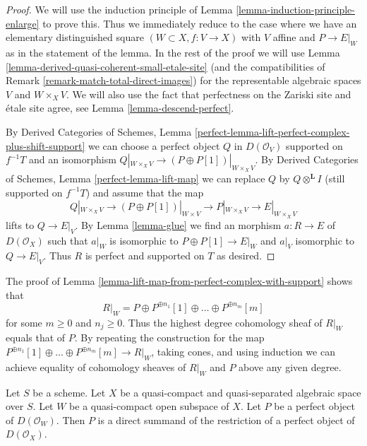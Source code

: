 \begin{proof}
We will use the induction principle of
Lemma \ref{lemma-induction-principle-enlarge} to prove this.
Thus we immediately reduce to the case where we have an
elementary distinguished square $(W \subset X, f : V \to X)$
with $V$ affine and $P \to E|_W$ as in the statement of the lemma.
In the rest of the proof we will use
Lemma \ref{lemma-derived-quasi-coherent-small-etale-site}
(and the compatibilities of Remark \ref{remark-match-total-direct-images})
for the representable algebraic spaces $V$ and $W \times_X V$.
We will also use the fact that perfectness on the Zariski site
and \'etale site agree, see Lemma \ref{lemma-descend-perfect}.

\medskip\noindent
By Derived Categories of Schemes,
Lemma \ref{perfect-lemma-lift-perfect-complex-plus-shift-support}
we can choose a perfect object $Q$ in $D(\mathcal{O}_V)$
supported on $f^{-1}T$ and an isomorphism
$Q|_{W \times_X V} \to (P \oplus P[1])|_{W \times_X V}$. By
Derived Categories of Schemes, Lemma \ref{perfect-lemma-lift-map}
we can replace $Q$ by $Q \otimes^\mathbf{L} I$ (still supported on $f^{-1}T$)
and assume that the map
$$
Q|_{W \times_X V} \to (P \oplus P[1])|_{W \times V}
\longrightarrow P|_{W \times_X V}
\longrightarrow
E|_{W \times_X V}
$$
lifts to $Q \to E|_V$. By Lemma \ref{lemma-glue}
we find an morphism $a : R \to E$ of $D(\mathcal{O}_X)$
such that $a|_W$ is isomorphic to $P \oplus P[1] \to E|_W$
and $a|_V$ isomorphic to $Q \to E|_V$.
Thus $R$ is perfect and supported on $T$ as desired.
\end{proof}

\begin{remark}
\label{remark-addendum}
The proof of Lemma \ref{lemma-lift-map-from-perfect-complex-with-support}
shows that
$$
R|_W = P \oplus P^{\oplus n_1}[1] \oplus \ldots \oplus P^{\oplus n_m}[m]
$$
for some $m \geq 0$ and $n_j \geq 0$. Thus the highest degree cohomology sheaf
of $R|_W$ equals that of $P$. By repeating the construction for the map
$P^{\oplus n_1}[1] \oplus \ldots \oplus P^{\oplus n_m}[m] \to R|_W$, taking
cones, and using induction we can achieve equality of cohomology sheaves
of $R|_W$ and $P$ above any given degree.
\end{remark}

\begin{lemma}
\label{lemma-direct-summand-of-a-restriction}
Let $S$ be a scheme.
Let $X$ be a quasi-compact and quasi-separated algebraic space over $S$.
Let $W$ be a quasi-compact open subspace of $X$.
Let $P$ be a perfect object of $D(\mathcal{O}_W)$.
Then $P$ is a direct summand of the restriction of a perfect
object of $D(\mathcal{O}_X)$.
\end{lemma}

